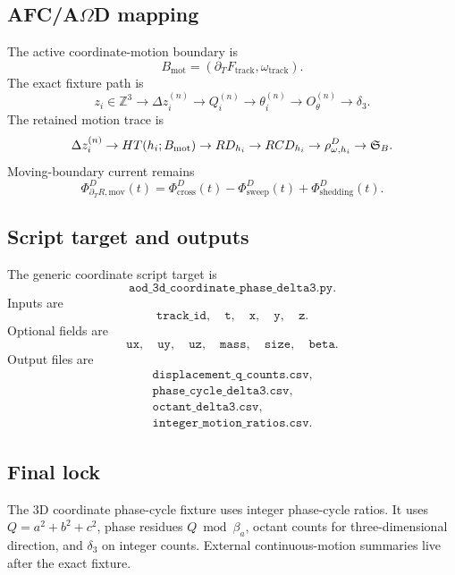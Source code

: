 \subsection{AFC/A\texorpdfstring{$\Omega$}{Omega}D mapping}
The active coordinate-motion boundary is
\[
B_{\mathrm{mot}}=(\partial_TF_{\mathrm{track}},\omega_{\mathrm{track}}).
\]
The exact fixture path is
\[
z_i\in\mathbb Z^3\rightarrow\Delta z_i^{(n)}\rightarrow Q_i^{(n)}\rightarrow\theta_i^{(n)}\rightarrow O_\theta^{(n)}\rightarrow\delta_3.
\]
The retained motion trace is
\[
\Delta z_i^{(n)}\rightarrow HT(h_i;B_{\mathrm{mot}})\rightarrow RD_{h_i}\rightarrow RCD_{h_i}\rightarrow\rho^D_{\omega,h_i}\rightarrow\mathfrak S_B.
\]
Moving-boundary current remains
\[
\Phi^D_{\partial_TR,\mathrm{mov}}(t)=\Phi^D_{\mathrm{cross}}(t)-\Phi^D_{\mathrm{sweep}}(t)+\Phi^D_{\mathrm{shedding}}(t).
\]

\subsection{Script target and outputs}
The generic coordinate script target is
\[
\texttt{aod\_3d\_coordinate\_phase\_delta3.py}.
\]
Inputs are
\[
\texttt{track\_id},\quad \texttt{t},\quad \texttt{x},\quad \texttt{y},\quad \texttt{z}.
\]
Optional fields are
\[
\texttt{ux},\quad \texttt{uy},\quad \texttt{uz},\quad \texttt{mass},\quad \texttt{size},\quad \texttt{beta}.
\]
Output files are
\[
\begin{gathered}
\texttt{displacement\_q\_counts.csv},\\
\texttt{phase\_cycle\_delta3.csv},\\
\texttt{octant\_delta3.csv},\\
\texttt{integer\_motion\_ratios.csv}.
\end{gathered}
\]

\subsection{Final lock}
The 3D coordinate phase-cycle fixture uses integer phase-cycle ratios. It uses \(Q=a^2+b^2+c^2\), phase residues \(Q\bmod\beta_a\), octant counts for three-dimensional direction, and \(\delta_3\) on integer counts. External continuous-motion summaries live after the exact fixture.
